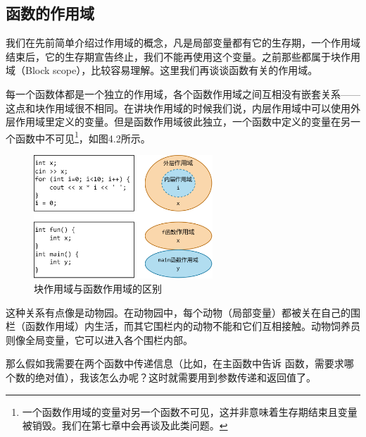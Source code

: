 \subsection*{函数的作用域}
我们在先前简单介绍过作用域的概念，凡是局部变量都有它的生存期，一个作用域结束后，它的生存期宣告终止，我们不能再使用这个变量。之前那些都属于块作用域（Block scope），比较容易理解。这里我们再谈谈函数有关的作用域。\par
每一个函数体都是一个独立的作用域，各个函数作用域之间互相没有嵌套关系——这点和块作用域很不相同。在讲块作用域的时候我们说，内层作用域中可以使用外层作用域里定义的变量。但是函数作用域彼此独立，一个函数中定义的变量在另一个函数中不可见\footnote{一个函数作用域的变量对另一个函数不可见，这并非意味着生存期结束且变量被销毁。我们在第七章中会再谈及此类问题。}，如图4.2所示。\par
\begin{figure}[htbp]
    \centering
    \includegraphics[width=0.6\textwidth]{../images/generalized_parts/04_block_scope_and_function_scope.png}
    \caption{块作用域与函数作用域的区别}
\end{figure}
这种关系有点像是动物园。在动物园中，每个动物（局部变量）都被关在自己的围栏（函数作用域）内生活，而其它围栏内的动物不能和它们互相接触。动物饲养员则像全局变量，它可以进入各个围栏内部。\par
那么假如我需要在两个函数中传递信息（比如，在主函数中告诉 \lstinline@f@ 函数，需要求哪个数的绝对值），我该怎么办呢？这时就需要用到参数传递和返回值了。\par
